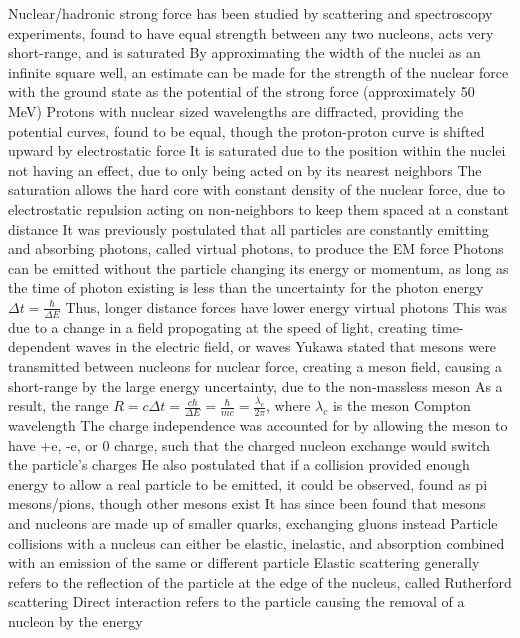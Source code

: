 \documentclass[11 pt, twoside]{article}
\newenvironment{outline*}
{
	\begin{outline}[enumerate]
	}
	{\end{outline}
}
\begin{document}
\begin{outline*}
\1 Nuclear/hadronic strong force has been studied by scattering and spectroscopy experiments, found to have equal strength between any two nucleons, acts very short-range, and is saturated
	\2 By approximating the width of the nuclei as an infinite square well, an estimate can be made for the strength of the nuclear force with the ground state as the potential of the strong force (approximately 50 MeV)
	\2 Protons with nuclear sized wavelengths are diffracted, providing the potential curves, found to be equal, though the proton-proton curve is shifted upward by electrostatic force
		\3 It is saturated due to the position within the nuclei not having an effect, due to only being acted on by its nearest neighbors
		\3 The saturation allows the hard core with constant density of the nuclear force, due to electrostatic repulsion acting on non-neighbors to keep them spaced at a constant distance
	\2 It was previously postulated that all particles are constantly emitting and absorbing photons, called virtual photons, to produce the EM force
		\3 Photons can be emitted without the particle changing its energy or momentum, as long as the time of photon existing is less than the uncertainty for the photon energy $\Delta t = \frac{\hbar}{\Delta E}$
			\4 Thus, longer distance forces have lower energy virtual photons
			\4 This was due to a change in a field propogating at the speed of light, creating time-dependent waves in the electric field, or waves
		\3 Yukawa stated that mesons were transmitted between nucleons for nuclear force, creating a meson field, causing a short-range by the large energy uncertainty, due to the non-massless meson
			\4 As a result, the range $R = c\Delta t = \frac{c\hbar}{\Delta E} = \frac{\hbar}{mc} = \frac{\lambda_c}{2\pi}$, where $\lambda_c$ is the meson Compton wavelength
			\4 The charge independence was accounted for by allowing the meson to have +e, -e, or 0 charge, such that the charged nucleon exchange would switch the particle's charges
			\4 He also postulated that if a collision provided enough energy to allow a real particle to be emitted, it could be observed, found as pi mesons/pions, though other mesons exist
		\3 It has since been found that mesons and nucleons are made up of smaller quarks, exchanging gluons instead
\1 Particle collisions with a nucleus can either be elastic, inelastic, and absorption combined with an emission of the same or different particle
	\2 Elastic scattering generally refers to the reflection of the particle at the edge of the nucleus, called Rutherford scattering
		\3 Direct interaction refers to the particle causing the removal of a nucleon by the energy

\end{outline*}
\end{document}
